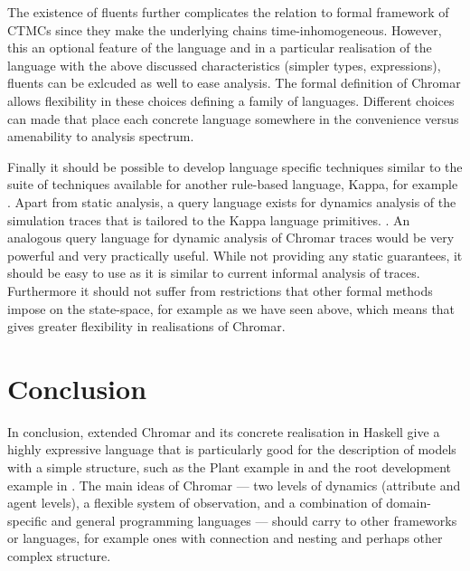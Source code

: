 The existence of fluents further complicates the relation to formal framework of
CTMCs since they make the underlying chains time-inhomogeneous. However, this an
optional feature of the language and in a particular realisation of the language
with the above discussed characteristics (\ie simpler types, expressions),
fluents can be exlcuded as well to ease analysis. The formal definition of
Chromar allows flexibility in these choices defining a family of
languages. Different choices can made that place each concrete language
somewhere in the convenience versus amenability to analysis spectrum.

Finally it should be possible to develop language specific techniques similar to
the suite of techniques available for another rule-based language, Kappa, for
example \cite{Boutillier_Camporesi_Coquet_Feret_Lý_Theret_Vignet_2018,
  Camporesi_Feret_Lý_2017}.  Apart from static analysis, a query language exists
for dynamics analysis of the simulation traces that is tailored to the Kappa
language primitives.  \cite{laurent_trace_2018}. An analogous query language for
dynamic analysis of Chromar traces would be very powerful and very practically
useful. While not providing any static guarantees, it should be easy to use as
it is similar to current informal analysis of traces. Furthermore it should not
suffer from restrictions that other formal methods impose on the state-space,
for example as we have seen above, which means that gives greater flexibility in
realisations of Chromar.

\section{Conclusion}
In conclusion, extended Chromar and its concrete realisation in Haskell give a
highly expressive language that is particularly good for the description of
models with a simple structure, such as the Plant example in
 and the root development example in
. The main ideas of Chromar --- two levels of dynamics
(attribute and agent levels), a flexible system of observation, and a
combination of domain-specific and general programming languages --- should
carry to other frameworks or languages, for example ones with connection and
nesting and perhaps other complex structure.

